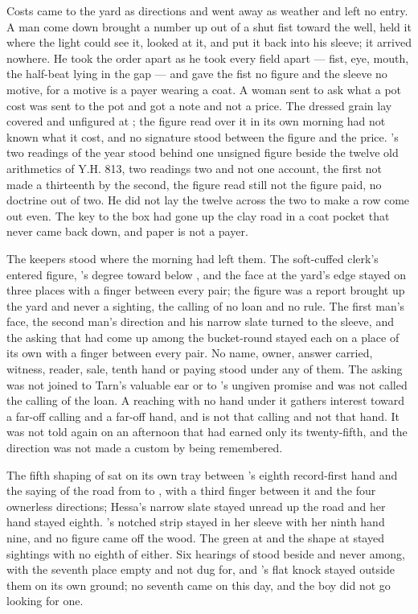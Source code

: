 Costs came to the yard as directions and went away as weather and left no entry. A man come down  brought a number up out of a shut fist toward the well, held it where the light could see it, looked at it, and put it back into his sleeve; it arrived nowhere. He took the order apart as he took every field apart --- fist, eye, mouth, the half-beat lying in the gap --- and gave the fist no figure and the sleeve no motive, for a motive is a payer wearing a coat. A woman sent to ask what a pot cost was sent to the pot and got a note and not a price. The dressed grain lay covered and unfigured at ; the figure read over it in its own morning had not known what it cost, and no signature stood between the figure and the price. 's two readings of the year stood behind one unsigned figure beside the twelve old arithmetics of Y.H. 813, two readings two and not one account, the first not made a thirteenth by the second, the figure read still not the figure paid, no doctrine out of two. He did not lay the twelve across the two to make a row come out even. The key to the box had gone up the clay road in a coat pocket that never came back down, and paper is not a payer.

\scenebreak

The keepers stood where the morning had left them. The soft-cuffed clerk's entered figure, 's degree toward  below , and the face at the yard's edge stayed on three places with a finger between every pair; the figure was a report brought up the yard and never a sighting, the calling of no loan and no rule. The first man's face, the second man's direction and his narrow slate turned to the sleeve, and the asking that had come up among the bucket-round stayed each on a place of its own with a finger between every pair. No name, owner, answer carried, witness, reader, sale, tenth hand or paying stood under any of them. The asking was not joined to Tarn's valuable ear or to 's ungiven promise and was not called the calling of the loan. A reaching with no hand under it gathers interest toward a far-off calling and a far-off hand, and is not that calling and not that hand. It was not told again on an afternoon that had earned only its twenty-fifth, and the direction was not made a custom by being remembered.

The fifth shaping of  sat on its own tray between 's eighth record-first hand and the saying of the road from  to , with a third finger between it and the four ownerless directions; Hessa's narrow slate stayed unread up the road and her hand stayed eighth. 's notched strip stayed in her sleeve with her ninth hand nine, and no figure came off the wood. The green at  and the shape at  stayed sightings with no eighth of either. Six hearings of  stood beside and never among, with the seventh place empty and not dug for, and 's flat knock stayed outside them on its own ground; no seventh came on this day, and the boy did not go looking for one.

